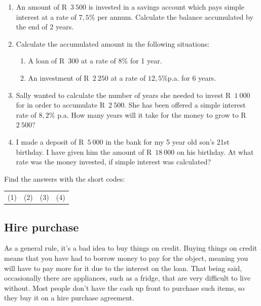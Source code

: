 \begin{exercises}{}
    \begin{enumerate}[itemsep=6pt, label=\textbf{\arabic*}.]
	\item An amount of R~$3~500$ is invested in a savings account which pays simple interest at a rate of $7,5\%$ per annum. Calculate the balance accumulated by the end of 2 years.

	\item Calculate the accumulated amount in the following situations:
	\begin{enumerate}[noitemsep, label=\textbf{(\alph*)} ]
	    \item A loan of R~$300$ at a rate of $8\%$ for 1 year.

	    \item An investment of R~$2~250$ at a rate of $12,5\%$p.a. for 6 years.
	\end{enumerate}

	\item Sally wanted to calculate the number of years she needed to invest R~$1~000$ for in order to accumulate R~$2~500$. She has been offered a simple interest rate of $8,2\%$ p.a. How many years will it take for the money to grow to R~$2~500$?

	\item I made a deposit of R~$5~000$ in the bank for my 5 year old son’s 21st birthday. I have given him the amount of R~$18~000$ on his birthday. At what rate was the money invested, if simple interest was calculated?\\
    \end{enumerate}

    Find the answers with the short codes:\\
    \begin{tabularx}{\textwidth}{ XXXX }
	(1)	&	(2)	&	(3)	&	(4)\\
    \end{tabularx}
\end{exercises}


\subsection{Hire purchase}

As a general rule, it’s a bad idea to buy things on credit. Buying things on credit means that you have had to borrow money to pay for the object, meaning you will have to pay more for it due to the interest on the loan. That being said, occasionally there are appliances, such as a fridge, that are very difficult to live without. Most people don’t have the cash up front to purchase such items, so they buy it on a hire purchase agreement.\par

